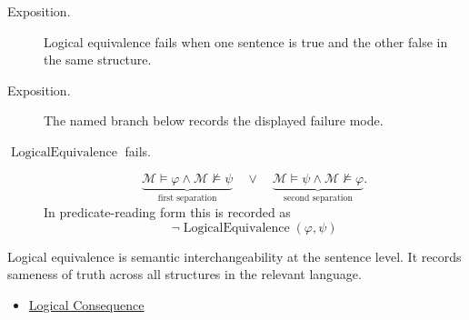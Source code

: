 \begin{remark*}
\begin{description}
  \item[Exposition.] Logical equivalence fails when one sentence is true and the other false in the
same structure.
\end{description}
\end{remark*}

\begin{remark*}
\begin{description}
  \item[Exposition.] The named branch below records the displayed failure mode.
\item[\(\operatorname{LogicalEquivalence}\) fails.] \[
\underbrace{\mathcal M\models\varphi \land \mathcal M\not\models\psi}_{\text{first separation}}
\quad\lor\quad
\underbrace{\mathcal M\models\psi \land \mathcal M\not\models\varphi}_{\text{second separation}}.
\]
  In predicate-reading form this is recorded as
  \[
    \neg\operatorname{LogicalEquivalence}(\varphi,\psi)
  \]
\end{description}
\end{remark*}

\begin{remark*}[Interpretation]
Logical equivalence is semantic interchangeability at the sentence level. It
records sameness of truth across all structures in the relevant language.
\end{remark*}

\begin{dependencies}
\begin{itemize}
  \item \hyperref[def:log-consequence]{Logical Consequence}
\end{itemize}
\end{dependencies}
